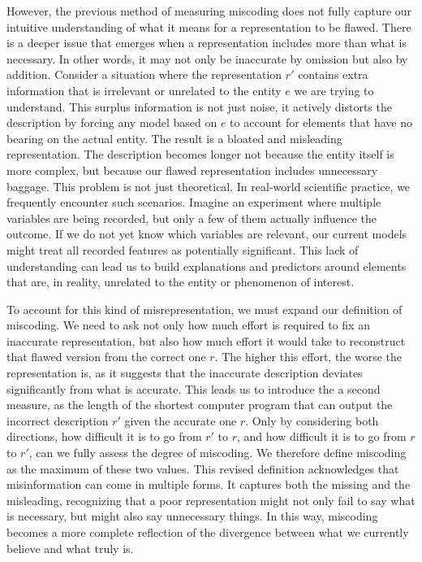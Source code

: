 However, the previous method of measuring miscoding does not fully capture our intuitive understanding of what it means for a representation to be flawed. There is a deeper issue that emerges when a representation includes more than what is necessary. In other words, it may not only be inaccurate by omission but also by addition. Consider a situation where the representation $r'$ contains extra information that is irrelevant or unrelated to the entity $e$ we are trying to understand. This surplus information is not just noise, it actively distorts the description by forcing any model based on $e$ to account for elements that have no bearing on the actual entity. The result is a bloated and misleading representation. The description becomes longer not because the entity itself is more complex, but because our flawed representation includes unnecessary baggage. This problem is not just theoretical. In real-world scientific practice, we frequently encounter such scenarios. Imagine an experiment where multiple variables are being recorded, but only a few of them actually influence the outcome. If we do not yet know which variables are relevant, our current models might treat all recorded features as potentially significant. This lack of understanding can lead us to build explanations and predictors around elements that are, in reality, unrelated to the entity or phenomenon of interest.

To account for this kind of misrepresentation, we must expand our definition of miscoding. We need to ask not only how much effort is required to fix an inaccurate representation, but also how much effort it would take to reconstruct that flawed version from the correct one $r$. The higher this effort, the worse the representation is, as it suggests that the inaccurate description deviates significantly from what is accurate. This leads us to introduce the a second measure, as the length of the shortest computer program that can output the incorrect description $r'$ given the accurate one $r$. Only by considering both directions, how difficult it is to go from $r'$ to $r$, and how difficult it is to go from $r$ to $r'$, can we fully assess the degree of miscoding. We therefore define miscoding as the maximum of these two values. This revised definition acknowledges that misinformation can come in multiple forms. It captures both the missing and the misleading, recognizing that a poor representation might not only fail to say what is necessary, but might also say unnecessary things. In this way, miscoding becomes a more complete reflection of the divergence between what we currently believe and what truly is.

